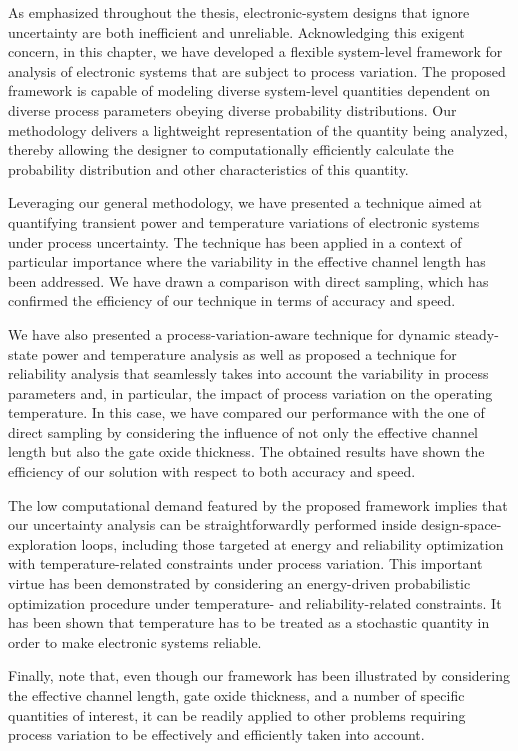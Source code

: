 As emphasized throughout the thesis, electronic-system designs that ignore
uncertainty are both inefficient and unreliable. Acknowledging this exigent
concern, in this chapter, we have developed a flexible system-level framework
for analysis of electronic systems that are subject to process variation. The
proposed framework is capable of modeling diverse system-level quantities
dependent on diverse process parameters obeying diverse probability
distributions. Our methodology delivers a lightweight representation of the
quantity being analyzed, thereby allowing the designer to computationally
efficiently calculate the probability distribution and other characteristics of
this quantity.

Leveraging our general methodology, we have presented a technique aimed at
quantifying transient power and temperature variations of electronic systems
under process uncertainty. The technique has been applied in a context of
particular importance where the variability in the effective channel length has
been addressed. We have drawn a comparison with direct sampling, which has
confirmed the efficiency of our technique in terms of accuracy and speed.

We have also presented a process-variation-aware technique for dynamic
steady-state power and temperature analysis as well as proposed a technique for
reliability analysis that seamlessly takes into account the variability in
process parameters and, in particular, the impact of process variation on the
operating temperature. In this case, we have compared our performance with the
one of direct sampling by considering the influence of not only the effective
channel length but also the gate oxide thickness. The obtained results have
shown the efficiency of our solution with respect to both accuracy and speed.

The low computational demand featured by the proposed framework implies that our
uncertainty analysis can be straightforwardly performed inside
design-space-exploration loops, including those targeted at energy and
reliability optimization with temperature-related constraints under process
variation. This important virtue has been demonstrated by considering an
energy-driven probabilistic optimization procedure under temperature- and
reliability-related constraints. It has been shown that temperature has to be
treated as a stochastic quantity in order to make electronic systems reliable.

Finally, note that, even though our framework has been illustrated by
considering the effective channel length, gate oxide thickness, and a number of
specific quantities of interest, it can be readily applied to other problems
requiring process variation to be effectively and efficiently taken into
account.
